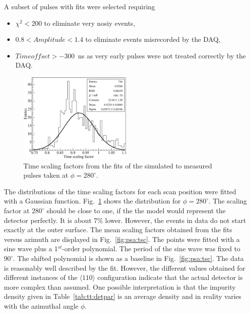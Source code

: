 A subset of pulses with fits were selected requiring
\begin{itemize}
\item $\chi^{2} < 200$ to eliminate very nosiy events,
\item $0.8 < Amplitude < 1.4$ to eliminate events misrecorded by the DAQ,
\item $Time offset > -300$~ns as very early pulses were not treated correctly by the DAQ.
\end{itemize}

\begin{figure}[htbp]
\centering
\includegraphics[width=0.5\textwidth]{tscale280}
\caption{Time scaling factors from the fits of the simulated to measured pulses taken at $\phi=280^{\circ}$.}
\label{fig:psa:ts280}
\end{figure}
The distributions of the time scaling factors for each scan position were fitted with a Gaussian function. Fig.~\ref{fig:psa:ts280} shows the distribution for $\phi = 280^{\circ}$. 
The scaling factor at $280^{\circ}$ should be close to one, if the the model would represent the detector perfectly. It is about 7\% lower.
However, the events in data do not start exactly at the outer surface.
The mean scaling factors obtained from the fits versus azimuth are displayed in Fig.~\ref{fig:psa:tsc}. The points were fitted with a sine wave plus a 1$^{st}$-order polynomial. The period of the sine wave was fixed to $90^{\circ}$. The shifted polynomial is shown as a baseline in Fig.~\ref{fig:psa:tsc}. The data is reasonably well described by the fit. However, the different values obtained for different instances of the $\langle 110 \rangle$ configuration indicate that the actual detector is more complex than assumed. One possible interpretation is that the impurity density given in Table~\ref{tab:tt:detpar} is an average density and in reality varies with the azimuthal angle $\phi$.

